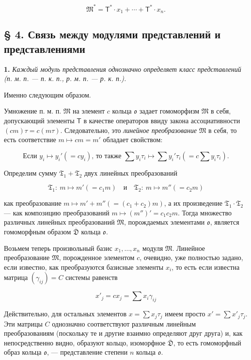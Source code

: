 \documentclass[11pt]{article}
\begin{document}
\[
\mathfrak M^*=\mathsf T^*\cdot x_1+\cdots+\mathsf T^*\cdot x_n.
\]

\subsection*{§ 4. Связь между модулями представлений и представлениями}\label{der-zusammenhang-zwischen-darstellungsmoduln-und-darstellungen}

\textbf{1.} \emph{Каждый модуль представления однозначно определяет класс представлений (п. м. п. --- п. к. п., р. м. п. --- р. к. п.).}

Именно следующим образом.

Умножение п. м. п. \(\mathfrak M\) на элемент \(c\) кольца \(\mathfrak{o}\) задает гомоморфизм \(\mathfrak M\) в себя, допускающий элементы \(\mathsf T\) в качестве операторов ввиду закона ассоциативности \((cm)\tau=c(m\tau)\). Следовательно, это \emph{линейное преобразование} \(\mathfrak M\) в себя, то есть соответствие \(m\mapsto cm=m'\) обладает свойством:

\[
\text{Если } y_i\mapsto y_i'(=cy_i) \text{, то также }
\sum y_i\tau_i\mapsto \sum y_i'\tau_i\left(=c\sum y_i\tau_i\right).
\]

Определим сумму \(\mathfrak T_1+\mathfrak T_2\) двух линейных преобразований

\[
\mathfrak T_1:\ m\mapsto m'(=c_1m)
\quad\text{и}\quad
\mathfrak T_2:\ m\mapsto m''(=c_2m)
\]

как преобразование \(m\mapsto m'+m''(=(c_1+c_2)m)\), а их произведение \(\mathfrak T_1\cdot\mathfrak T_2\) --- как композицию преобразований \(m\mapsto (m'')'=c_1c_2m\). Тогда множество различных линейных преобразований \(\mathfrak M\), порождаемых элементами \(\mathfrak{o}\), является гомоморфным образом \(\overline{\mathfrak D}\) кольца \(\mathfrak{o}\).

Возьмем теперь произвольный базис \(x_1,\ldots,x_n\) модуля \(\mathfrak M\). Линейное преобразование \(\mathfrak M\), порожденное элементом \(c\), очевидно, уже полностью задано, если известно, как преобразуются базисные элементы \(x_i\), то есть если известна матрица \((\gamma_{ij})=C\) системы равенств

\[
x'_j=cx_j=\sum x_i\gamma_{ij}
\]

Действительно, для остальных элементов \(x=\sum x_j\tau_j\) имеем просто \(x'=\sum x'_j\tau_j\). Эти матрицы \(C\) однозначно соответствуют различным линейным преобразованиям (поскольку те и другие взаимно определяют друг друга) и, как непосредственно видно, образуют кольцо, изоморфное \(\overline{\mathfrak D}\), то есть гомоморфный образ кольца \(\mathfrak{o}\), --- представление степени \(n\) кольца \(\mathfrak{o}\).
\end{document}
